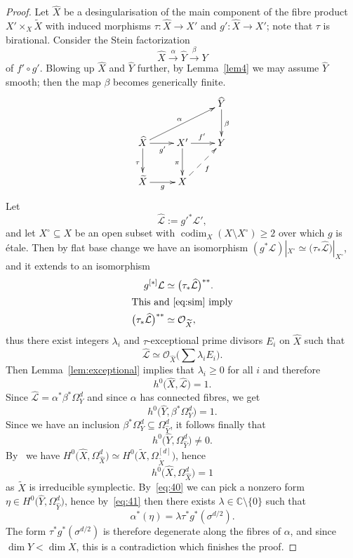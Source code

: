 \documentclass[11pt]{article}
\theoremstyle{definition}
\numberwithin{equation}{section}
\numberwithin{figure}{section}
\numberwithin{table}{section}
\DeclareMathOperator{\codim}{codim}
\newcommand{\Cbb}{\mathbb{C}}
\newcommand\sL{\mathcal{L}}
\newcommand{\OO}{\mathcal{O}}
\begin{document}
\begin{proof}
Let $\widehat X$ be a desingularisation of the main component of the fibre product $X' \times_X \widetilde X$ with induced morphisms $\tau\colon \widehat X \to X'$ and $g'\colon \widehat X \to X'$; note that $\tau $ is birational. Consider the Stein factorization
\[
\widehat X \overset{\alpha}{\longrightarrow} \widehat Y \overset{\beta}{\longrightarrow} Y
\]
of $f' \circ g'$. Blowing up $\widehat X$ and $\widehat Y$ further, by Lemma~\ref{lem4} we may assume $\widehat Y$ smooth; then the map $\beta$ becomes generically finite.
\[
\xymatrix{ & & \widehat Y \ar[d]^\beta \\
\widehat X\ar[d]_{\tau} \ar[r]_{g'} \ar[urr]^\alpha & X' \ar[d]_\pi \ar[r]^{f'} & Y \\
\widetilde X \ar[r]_g & X \ar@{-->}[ur]_f & }
\]
Let
\[
\widehat {\sL} := g'^*\sL',
\]
and let $X^\circ\subseteq X$ be an open subset with $\codim_X(X\setminus X^\circ)\geq2$ over which $g$ is étale. Then by flat base change we have an isomorphism $ (g^*\sL)|_{X^\circ} \simeq \big(\tau_*\widehat {\sL}\big)|_{X^\circ}$, and it extends to an isomorphism
\begin{align*}
g^{[*]}\sL &\simeq \big(\tau_*\widehat {\sL}\big)^{**}.\\
\intertext{This and~\eqref{eq:sim} imply}
\big(\tau_*\widehat {\sL}\big)^{**} &\simeq \OO_{\widetilde X},
\end{align*}
thus there exist integers $\lambda_i $ and $\tau$-exceptional prime divisors $E_i$ on $\widehat X$ such that
\[
 \widehat {\sL} \simeq \OO_{\widehat X}\big(\sum \lambda_i E_i\big).
\]
Then Lemma~\ref{lem:exceptional} implies that $\lambda_i\geq0$ for all $i$ and therefore
\[
h^0\big(\widehat X, \widehat {\sL}\big) = 1.
\]
Since $ \widehat {\sL} = \alpha^* \beta^*\Omega_Y^d$ and since $\alpha$ has connected fibres, we get
\[
h^0\big(\widehat Y,\beta^*\Omega_Y^d\big) =1.
\]
Since we have an inclusion $\beta^*\Omega_Y^d\subseteq\Omega_{\widehat{Y}}^d$, it follows finally that
\begin{equation}\label{eq:40}
h^0\big(\widehat Y,\Omega_{\widehat{Y}}^d\big) \ne 0.
\end{equation}
By~\cite[Theorem~1.4]{GKKP11} we have $ H^0\big(\widehat X,\Omega^d_{\widehat X}\big) \simeq H^0\big(\widetilde X, \Omega^{[d]}_{\widetilde X}\big)$, hence
\begin{equation}\label{eq:41}
h^0\big(\widehat X,\Omega^d_{\widehat X}\big) = 1
\end{equation}
as $\widetilde X$ is irreducible symplectic. By~\eqref{eq:40} we can pick a nonzero form $ \eta \in H^0\big(\widehat Y,\Omega^d_{\widehat Y}\big)$, hence by~\eqref{eq:41} then there exists $\lambda \in \Cbb\setminus\{0\}$ such that
\[
\alpha^*(\eta) = \lambda \tau^* g^*(\sigma^{d/2}).
\]
The form $ \tau^* g^*(\sigma^{d/2})$ is therefore degenerate along the fibres of $\alpha$, and since\linebreak$\dim Y < \dim X$, this is a contradiction which finishes the proof.
\end{proof}
\end{document}
